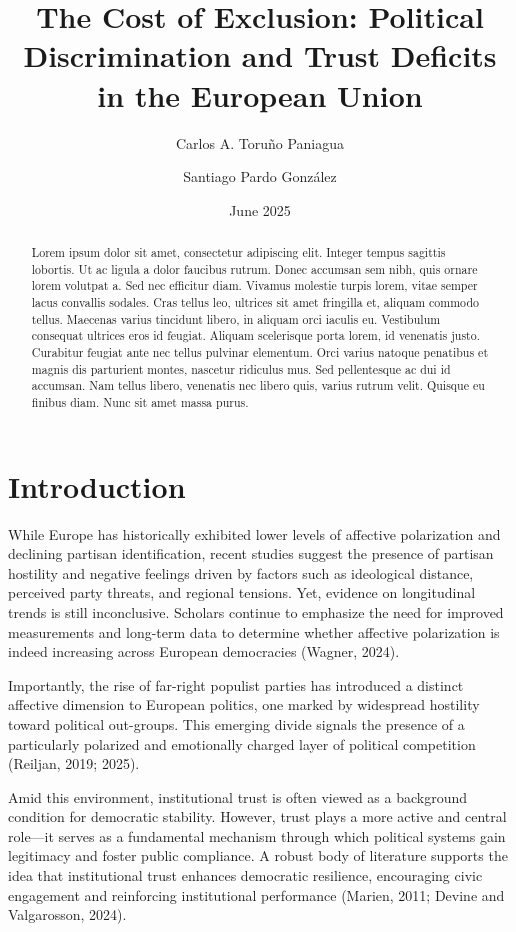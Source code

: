 \documentclass{article}
\title{The Cost of Exclusion: Political Discrimination and Trust Deficits in the European Union}
\author[1]{Carlos A. Toruño Paniagua}
\author[2]{Santiago Pardo González}
\affil[1,2]{\emph{The World Justice Project}}
\date{June 2025}
\begin{document}
\maketitle

\begin{abstract}
Lorem ipsum dolor sit amet, consectetur adipiscing elit. Integer tempus sagittis lobortis. Ut ac ligula a dolor faucibus rutrum. Donec accumsan sem nibh, quis ornare lorem volutpat a. Sed nec efficitur diam. Vivamus molestie turpis lorem, vitae semper lacus convallis sodales. Cras tellus leo, ultrices sit amet fringilla et, aliquam commodo tellus. Maecenas varius tincidunt libero, in aliquam orci iaculis eu. Vestibulum consequat ultrices eros id feugiat. Aliquam scelerisque porta lorem, id venenatis justo. Curabitur feugiat ante nec tellus pulvinar elementum. Orci varius natoque penatibus et magnis dis parturient montes, nascetur ridiculus mus. Sed pellentesque ac dui id accumsan. Nam tellus libero, venenatis nec libero quis, varius rutrum velit. Quisque eu finibus diam. Nunc sit amet massa purus.
\end{abstract}

\section{Introduction}

While Europe has historically exhibited lower levels of affective polarization and declining partisan identification, recent studies suggest the presence of partisan hostility and negative feelings driven by factors such as ideological distance, perceived party threats, and regional tensions. Yet, evidence on longitudinal trends is still inconclusive. Scholars continue to emphasize the need for improved measurements and long-term data to determine whether affective polarization is indeed increasing across European democracies (Wagner, 2024).

Importantly, the rise of far-right populist parties has introduced a distinct affective dimension to European politics, one marked by widespread hostility toward political out-groups. This emerging divide signals the presence of a particularly polarized and emotionally charged layer of political competition (Reiljan, 2019; 2025).

Amid this environment, institutional trust is often viewed as a background condition for democratic stability. However, trust plays a more active and central role—it serves as a fundamental mechanism through which political systems gain legitimacy and foster public compliance. A robust body of literature supports the idea that institutional trust enhances democratic resilience, encouraging civic engagement and reinforcing institutional performance (Marien, 2011; Devine and Valgarosson, 2024).
\end{document}

